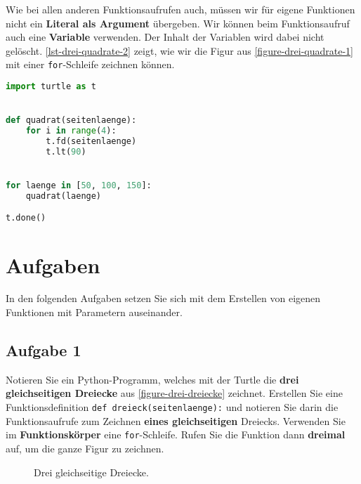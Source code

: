 Wie bei allen anderen Funktionsaufrufen auch, müssen wir für eigene Funktionen nicht ein \textbf{Literal als Argument} übergeben. Wir können beim Funktionsaufruf auch eine \textbf{Variable} verwenden. Der Inhalt der Variablen wird dabei nicht gelöscht. \autoref{lst-drei-quadrate-2} zeigt, wie wir die Figur aus \autoref{figure-drei-quadrate-1} mit einer \lstinline{for}-Schleife zeichnen können.

\begin{lstlisting}[language=python, caption={Variablen beim Funktionsaufruf in der \lstinline{for}-Schleifen (\graybgtexttt{drei\_quadrate\_2.py}).}, label={lst-drei-quadrate-2}]
import turtle as t


def quadrat(seitenlaenge):
    for i in range(4):
        t.fd(seitenlaenge)
        t.lt(90)


for laenge in [50, 100, 150]:
    quadrat(laenge)

t.done()
\end{lstlisting}

\section{Aufgaben}

In den folgenden Aufgaben setzen Sie sich mit dem Erstellen von eigenen Funktionen mit Parametern auseinander.

\subsection{Aufgabe 1}

Notieren Sie ein Python-Programm, welches mit der Turtle die \textbf{drei gleichseitigen Dreiecke} aus \autoref{figure-drei-dreiecke} zeichnet. Erstellen Sie eine Funktionsdefinition \lstinline{def dreieck(seitenlaenge):} und notieren Sie darin die Funktionsaufrufe zum Zeichnen \textbf{eines gleichseitigen} Dreiecks. Verwenden Sie im \textbf{Funktionskörper} eine \lstinline{for}-Schleife. Rufen Sie die Funktion dann \textbf{dreimal} auf, um die ganze Figur zu zeichnen.

\begin{figure}[htb]
\centering
{}
\caption{Drei gleichseitige Dreiecke.}
\label{figure-drei-dreiecke}
\end{figure}

